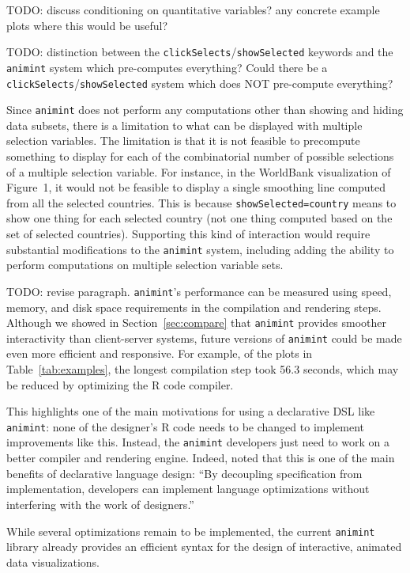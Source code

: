 \documentclass[journal]{vgtc}\usepackage[]{graphicx}\usepackage[]{color}
\begin{document}
TODO: discuss conditioning on quantitative variables? any concrete
example plots where this would be useful?

TODO: distinction between the \texttt{clickSelects}/\texttt{showSelected} keywords and
the \texttt{animint} system which pre-computes everything? Could there be a
\texttt{clickSelects}/\texttt{showSelected} system which does NOT pre-compute
everything?

Since \texttt{animint} does not perform any computations other than showing and
hiding data subsets, there is a limitation to what can be
displayed with multiple selection variables.
The limitation is that it is not feasible to precompute
something to display for each of the combinatorial number of
possible selections
of a multiple selection variable.
For instance, in the
WorldBank visualization of Figure~1, it would not be feasible to
display a single smoothing line computed from all the selected
countries. This is because \texttt{showSelected=country} means to show
one thing for each selected country (not one thing computed based on
the set of selected countries). Supporting this kind of interaction
would require substantial modifications to the \texttt{animint} system,
including adding the ability to perform computations on
multiple selection variable sets.

TODO: revise paragraph. \texttt{animint}'s performance can be measured using
speed, memory, and disk space requirements in the compilation and
rendering steps. Although we showed in Section~\ref{sec:compare} that
\texttt{animint} provides smoother interactivity than client-server systems,
future versions of \texttt{animint} could be made even more efficient and
responsive. For example, of the plots in Table~\ref{tab:examples}, the
longest compilation step took 56.3 seconds, which may be reduced by
optimizing the R code compiler.

This highlights one of the main motivations for using a declarative
DSL like \texttt{animint}: none of the designer's R code needs to be changed to
implement improvements like this. Instead, the \texttt{animint} developers just
need to work on a better compiler and rendering engine. Indeed,
\citet{declarative} noted that this is one of the main benefits of
declarative language design: ``By decoupling specification from
implementation, developers can implement language optimizations
without interfering with the work of designers.''

While several
optimizations remain to be implemented, the current \texttt{animint} library
already provides an efficient syntax for the design of interactive,
animated data visualizations.
\end{document}
